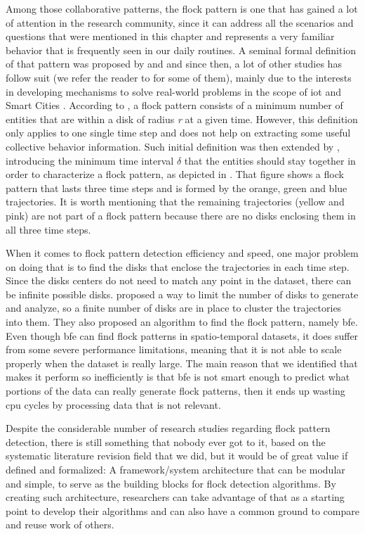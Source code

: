 Among those collaborative patterns, the flock pattern is one that has gained a lot of attention in the research
community, since it can address all the scenarios and questions that were mentioned in this chapter and represents a
very familiar behavior that is frequently seen in our daily routines. A seminal formal definition of that pattern was
proposed by  and  and since then, a lot of other studies has follow suit (we
refer the reader to  for some of them), mainly due to the interests in developing mechanisms to
solve real-world problems in the scope of \ac{iot} \cite{iot} and Smart Cities \cite{smartcities}. According to
, a flock pattern consists of a minimum number of entities that are within a disk of radius
\textit{r} at a given time. However, this definition only applies to one single time step and does not help on
extracting some useful collective behavior information. Such initial definition was then extended by
, introducing the minimum time interval $\delta$ that the entities should stay together in
order to characterize a flock pattern, as depicted in . That figure shows a flock pattern that lasts
three time steps and is formed by the orange, green and blue trajectories. It is worth mentioning that the remaining
trajectories (yellow and pink) are not part of a flock pattern because there are no disks enclosing them in all three
time steps.

When it comes to flock pattern detection efficiency and speed, one major problem on doing that is to find the disks that
enclose the trajectories in each time step. Since the disks centers do not need to match any point in the dataset, there
can be infinite possible disks.  proposed a way to limit the number of disks to generate and analyze,
so a finite number of disks are in place to cluster the trajectories into them. They also proposed an algorithm to find
the flock pattern, namely \ac{bfe}. Even though \ac{bfe} can find flock patterns in spatio-temporal datasets, it does
suffer from some severe performance limitations, meaning that it is not able to scale properly when the dataset is
really large. The main reason that we identified that makes it perform so inefficiently is that \ac{bfe} is not smart
enough to predict what portions of the data can really generate flock patterns, then it ends up wasting \ac{cpu} cycles
by processing data that is not relevant.

Despite the considerable number of research studies regarding flock pattern detection, there is still something that
nobody ever got to it, based on the systematic literature revision field that we did, but it would be of great value if
defined and formalized: A framework/system architecture that can be modular and simple, to serve as the building blocks
for flock detection algorithms. By creating such architecture, researchers can take advantage of that as a starting
point to develop their algorithms and can also have a common ground to compare and reuse work of others.

